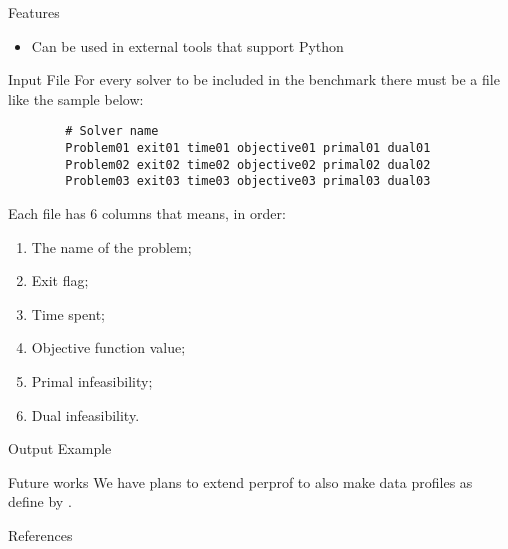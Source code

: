 \documentclass[paperwidth=90cm,paperheight=120cm,portrait]{baposter}
\begin{document}
\begin{poster}
\begin{posterbox}[name=features,below=perprof-py]{Features}
\begin{itemize}
          \item Can be used in external tools that support Python
        \end{itemize}

    \end{posterbox}

 \begin{posterbox}[name=inputfile,column=1,span=2]{Input File}  
        For every solver to be included in the benchmark there must be a file like
        the sample below:

        \begin{lstlisting}
        # Solver name
        Problem01 exit01 time01 objective01 primal01 dual01
        Problem02 exit02 time02 objective02 primal02 dual02
        Problem03 exit03 time03 objective03 primal03 dual03
        \end{lstlisting}

        Each file has 6 columns that means, in order:
        \begin{multicols}{2} 
          
        \begin{enumerate}
          \item The name of the problem;
          \item Exit flag;
          \item Time spent;
          \item Objective function value;
          \item Primal infeasibility;
          \item Dual infeasibility.
        \end{enumerate}
        \end{multicols} 
   \end{posterbox}
       \begin{posterbox}[name=output,column=1,span=2,below=inputfile]{Output Example}
        
       \end{posterbox}

      \begin{posterbox}[name=future,column=1,below=output,span=2]{Future works}
         We have plans to extend perprof to also make data profiles as define by
         \textcite{More2009}.
       \end{posterbox}


\begin{posterbox}[name=references,span=2,column=1,below=future]{References}
\smaller                          %
        \printbibliography[heading=none]

\end{posterbox}
   

\end{poster}
\end{document}
